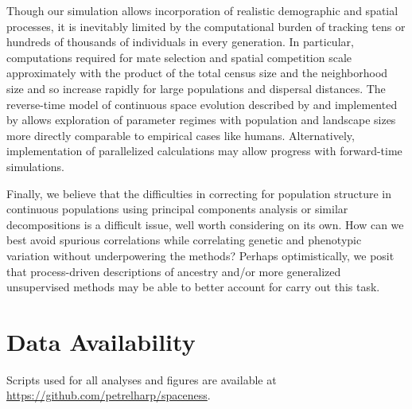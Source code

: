 \documentclass[10pt,twoside,lineno,hidelinks]{preprint}
\begin{document}
Though our simulation allows incorporation of realistic demographic and spatial processes, 
it is inevitably limited by the computational burden of tracking tens or hundreds of thousands of individuals in every generation. 
In particular, computations required for mate selection and spatial competition scale approximately with the product of the total census size and the neighborhood size and so increase rapidly for large populations and dispersal distances. 
The reverse-time model of continuous space evolution described by \citet{Barton2010} and implemented by \citet{Kelleher2014} 
allows exploration of parameter regimes with population and landscape sizes more directly comparable to empirical cases like humans. 
Alternatively, implementation of parallelized calculations may allow progress with forward-time simulations.



Finally, we believe that the difficulties in correcting for population structure in continuous populations 
using principal components analysis or similar decompositions is a difficult issue, well worth considering on its own.
How can we best avoid spurious correlations while correlating genetic and phenotypic variation 
without underpowering the methods?
Perhaps optimistically,
we posit that process-driven descriptions of ancestry 
and/or more generalized unsupervised methods may be able to better account for carry out this task.


\section{Data Availability}
Scripts used for all analyses and figures are available at \url{https://github.com/petrelharp/spaceness}. 
\end{document}
